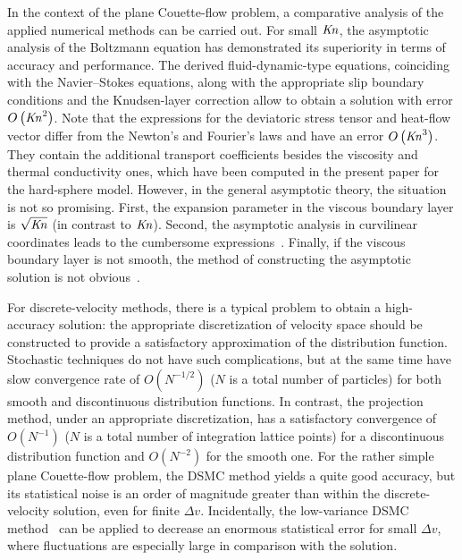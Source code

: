 \documentclass[review]{elsarticle}
\newcommand{\Kn}{\mbox{\textit{Kn}}}
\newcommand{\OO}[1]{O\left(#1\right)}
\begin{document}
In the context of the plane Couette-flow problem,
a comparative analysis of the applied numerical methods can be carried out.
For small \(\Kn\), the asymptotic analysis of the Boltzmann equation has demonstrated
its superiority in terms of accuracy and performance.
The derived fluid-dynamic-type equations, coinciding with the Navier--Stokes equations,
along with the appropriate slip boundary conditions and the Knudsen-layer correction
allow to obtain a solution with error \(\OO{\Kn^2}\).
Note that the expressions for the deviatoric stress tensor and heat-flow vector
differ from the Newton's and Fourier's laws and have an error \(\OO{\Kn^3}\).
They contain the additional transport coefficients besides the viscosity and thermal conductivity ones,
which have been computed in the present paper for the hard-sphere model.
However, in the general asymptotic theory, the situation is not so promising.
First, the expansion parameter in the viscous boundary layer is \(\sqrt{\Kn}\) (in contrast to \(\Kn\)).
Second, the asymptotic analysis in curvilinear coordinates leads to the cumbersome expressions~\citep{Sone2002}.
Finally, if the viscous boundary layer is not smooth,
the method of constructing the asymptotic solution is not obvious~\citep{Aoki2014}.

For discrete-velocity methods, there is a typical problem to obtain a high-accuracy solution:
the appropriate discretization of velocity space should be constructed
to provide a satisfactory approximation of the distribution function.
Stochastic techniques do not have such complications,
but at the same time have slow convergence rate of \(\OO{N^{-1/2}}\)
(\(N\) is a total number of particles)
for both smooth and discontinuous distribution functions.
In contrast, the projection method, under an appropriate discretization,
has a satisfactory convergence of \(\OO{N^{-1}}\)
(\(N\) is a total number of integration lattice points)
for a discontinuous distribution function and \(\OO{N^{-2}}\) for the smooth one.
For the rather simple plane Couette-flow problem,
the DSMC method yields a quite good accuracy, but its statistical noise
is an order of magnitude greater than within the discrete-velocity solution, even for finite \(\Delta{v}\).
Incidentally, the low-variance DSMC method~\citep{Hadji2011}
can be applied to decrease an enormous statistical error for small \(\Delta{v}\),
where fluctuations are especially large in comparison with the solution.
\end{document}
